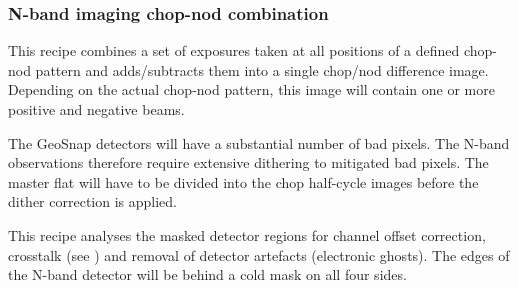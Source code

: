 
\subsubsection{N-band imaging chop-nod combination}
\label{img_n_chopnod}
\label{rec:img_n_chopnod}
\label{rec:metis_n_img_chopnod}
\label{sssec:img_n_chopnod}

This recipe combines a set of exposures taken at all positions of a
defined chop-nod pattern and adds/subtracts them into a single
chop/nod difference image. Depending on the actual chop-nod pattern,
this image will contain one or more positive and negative beams.

The GeoSnap detectors will have a substantial number of bad pixels.
The N-band observations therefore require extensive dithering to mitigated bad pixels.
The master flat will have to be divided into the chop half-cycle images before the dither correction is applied.

This recipe analyses the masked detector regions for channel offset correction, crosstalk (see \cite{matisse_minutes}) and removal of detector artefacts (electronic ghosts).
The edges of the N-band detector will be behind a cold mask on all four sides.


